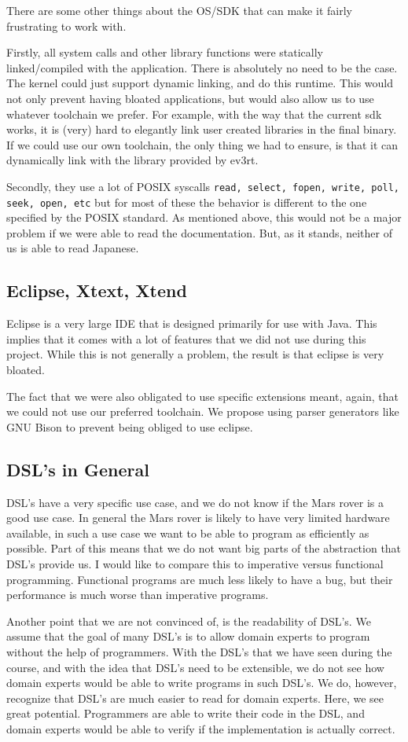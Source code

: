 \documentclass{scrartcl}
\begin{document}
There are some other things about the OS/SDK that can make it fairly frustrating to work with.

Firstly, all system calls and other library functions were statically linked/compiled with the application.
There is absolutely no need to be the case.
The kernel could just support dynamic linking, and do this runtime.
This would not only prevent having bloated applications, but would also allow us to use whatever toolchain we prefer.
For example, with the way that the current sdk works, it is (very) hard to elegantly link user created libraries in the final binary.
If we could use our own toolchain, the only thing we had to ensure, is that it can dynamically link with the library provided by ev3rt.

Secondly, they use a lot of POSIX syscalls \texttt{read, select, fopen, write, poll, seek, open, etc} but for most of these the behavior is different to the one specified by the POSIX standard.
As mentioned above, this would not be a major problem if we were able to read the documentation.
But, as it stands, neither of us is able to read Japanese.

\subsection{Eclipse, Xtext, Xtend}
Eclipse is a very large IDE that is designed primarily for use with Java.
This implies that it comes with a lot of features that we did not use during this project.
While this is not generally a problem, the result is that eclipse is very bloated.

The fact that we were also obligated to use specific extensions meant, again, that we could not use our preferred toolchain.
We propose using parser generators like GNU Bison to prevent being obliged to use eclipse.

\subsection{DSL's in General}
DSL's have a very specific use case, and we do not know if the Mars rover is a good use case.
In general the Mars rover is likely to have very limited hardware available, in such a use case we want to be able to program as efficiently as possible.
Part of this means that we do not want big parts of the abstraction that DSL's provide us.
I would like to compare this to imperative versus functional programming.
Functional programs are much less likely to have a bug, but their performance is much worse than imperative programs.

Another point that we are not convinced of, is the readability of DSL's.
We assume that the goal of many DSL's is to allow domain experts to program without the help of programmers.
With the DSL's that we have seen during the course, and with the idea that DSL's need to be extensible, we do not see how domain experts would be able to write programs in such DSL's.
We do, however, recognize that DSL's are much easier to read for domain experts.
Here, we see great potential.
Programmers are able to write their code in the DSL, and domain experts would be able to verify if the implementation is actually correct.
\end{document}
